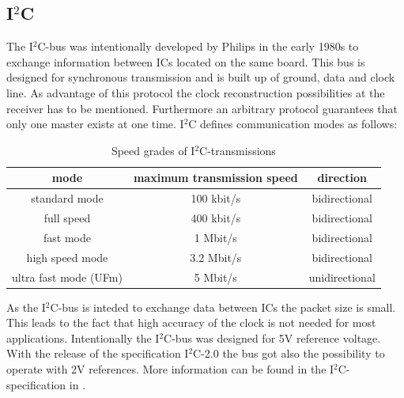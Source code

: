 \subsection{I$^2$C}
The I$^2$C-bus was intentionally developed by Philips in the early 1980s to exchange information between ICs located on the same board. This bus is designed for synchronous transmission and is built up of ground, data and clock line. As advantage of this protocol the clock reconstruction possibilities at the receiver has to be mentioned. Furthermore an arbitrary protocol guarantees that only one master exists at one time.\cite{Wue06} I$^2$C defines communication modes as follows:
\begin{table}
\begin{center}
\begin{tabular}{|c||c|c|}
\hline
mode & maximum transmission speed & direction\\
\hline\hline
standard mode & 100 kbit/s & bidirectional\\
\hline
full speed & 400 kbit/s & bidirectional\\
\hline
fast mode & 1 Mbit/s & bidirectional\\
\hline
high speed mode & 3.2 Mbit/s & bidirectional\\
\hline
ultra fast mode (UFm) & 5 Mbit/s & unidirectional\\
\hline
\end{tabular}
\caption{Speed grades of I$^2$C-transmissions\cite{I2Cspeed}}
\label{tab:rsstates}
\end{center}
\end{table}
As the I$^2$C-bus is inteded to exchange data between ICs the packet size is small. This leads to the fact that high accuracy of the clock is not needed for most applications.\cite{I2Cspeed} Intentionally the I$^2$C-bus was designed for 5V reference voltage. With the release of the specification I$^2$C-2.0 the bus got also the possibility to operate with 2V references.\cite{I2Cvoltage}
More information can be found in the I$^2$C-specification in \cite{I2Cspec}.
